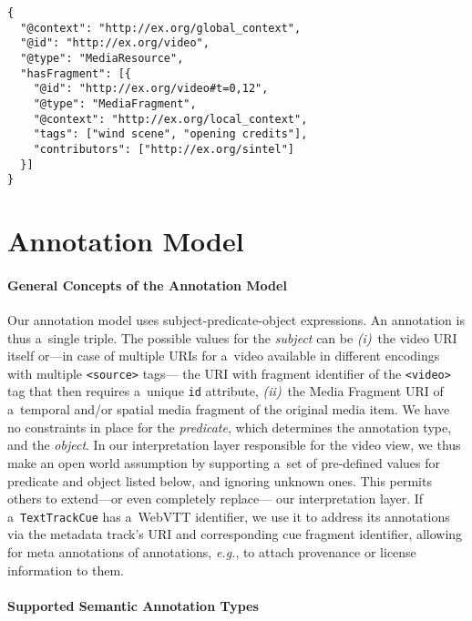 \documentclass{sig-alternate}
\newcommand{\inlinelistingsize}{\fontsize{8pt}{11pt}}
\let\oldurl\url
\renewcommand{\url}[1]{\inlinelistingsize\oldurl{#1}}
\def\JSONLD{\mbox{JSON-LD}}
\begin{document}
\begin{lstlisting}[caption={Generated \JSONLD~for the Web of Data, see
    \url{http://bit.ly/webvtt-jsonld} for the RDF triples},
  label=listing:jsonld, float=t!]
{
  "@context": "http://ex.org/global_context",
  "@id": "http://ex.org/video",
  "@type": "MediaResource",
  "hasFragment": [{
    "@id": "http://ex.org/video#t=0,12",
    "@type": "MediaFragment",
    "@context": "http://ex.org/local_context",
    "tags": ["wind scene", "opening credits"],
    "contributors": ["http://ex.org/sintel"]
  }]
}
\end{lstlisting}

\section{Annotation Model}

\paragraph{General Concepts of the Annotation Model}

Our annotation model uses subject-predicate-object expressions.
An annotation is thus a~single triple.
The possible values for the \emph{subject} can be \emph{(i)}~the video
URI itself or---in case of multiple URIs for a~video available
in different encodings with multiple \texttt{<source>} tags---%
the URI with fragment identifier of the \texttt{<video>} tag
that then requires a~unique \texttt{id} attribute,
\emph{(ii)}~the Media Fragment URI of a~temporal and/or spatial
media fragment of the original media item.
We have no constraints in place for the \emph{predicate},
which determines the annotation type, and the \emph{object}.
In our interpretation layer responsible for the video view,
we thus make an open world assumption
by supporting a~set of pre-defined values for predicate and object
listed below, and ignoring unknown ones.
This permits others to extend---or even completely replace---%
our interpretation layer.
If a~\texttt{TextTrackCue} has a~WebVTT identifier,
we use it to address its annotations
via the metadata track's URI
and corresponding cue fragment identifier,
allowing for meta annotations of annotations, \emph{e.g.},
to attach provenance or license information to them.

\paragraph{Supported Semantic Annotation Types}
\end{document}
